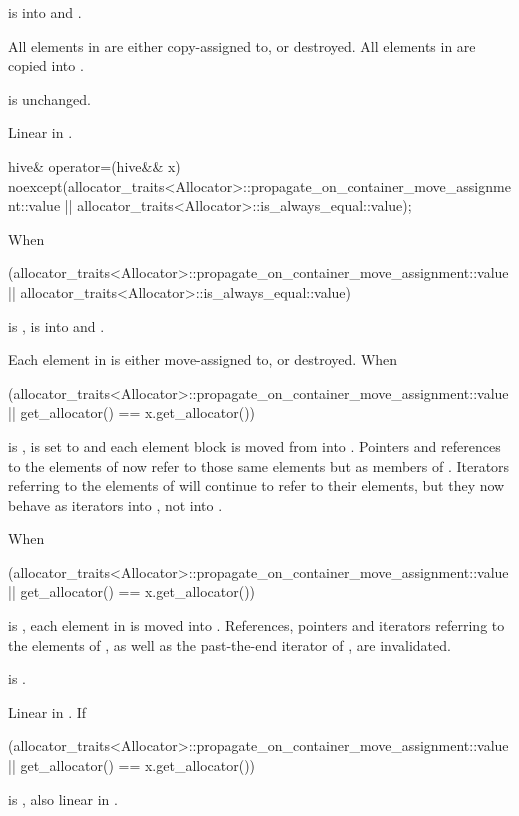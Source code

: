 \begin{itemdescr}
\pnum
\expects
{} is  into  and
.

\pnum
\effects
All elements in  are either copy-assigned to, or destroyed.
All elements in  are copied into .
\begin{note}
 is unchanged.
\end{note}

\pnum
\complexity
Linear in .
\end{itemdescr}

%
\begin{itemdecl}
hive& operator=(hive&& x)
  noexcept(allocator_traits<Allocator>::propagate_on_container_move_assignment::value ||
           allocator_traits<Allocator>::is_always_equal::value);
\end{itemdecl}

\begin{itemdescr}
\pnum
\expects
When
\begin{codeblock}
(allocator_traits<Allocator>::propagate_on_container_move_assignment::value ||
 allocator_traits<Allocator>::is_always_equal::value)
\end{codeblock}
is ,
 is  into  and
.

\pnum
\effects
Each element in  is either move-assigned to, or destroyed.
When
\begin{codeblock}
(allocator_traits<Allocator>::propagate_on_container_move_assignment::value ||
 get_allocator() == x.get_allocator())
\end{codeblock}
is ,
 is set to  and
each element block is moved from  into .
Pointers and references to the elements of 
now refer to those same elements but as members of .
Iterators referring to the elements of 
will continue to refer to their elements,
but they now behave as iterators into , not into .

When
\begin{codeblock}
(allocator_traits<Allocator>::propagate_on_container_move_assignment::value ||
 get_allocator() == x.get_allocator())
\end{codeblock}
is ,
each element in  is moved into .
References, pointers and iterators referring to the elements of ,
as well as the past-the-end iterator of , are invalidated.

\pnum
\ensures
{} is .

\pnum
\complexity
Linear in .
If
\begin{codeblock}
(allocator_traits<Allocator>::propagate_on_container_move_assignment::value ||
 get_allocator() == x.get_allocator())
\end{codeblock}
is , also linear in .
\end{itemdescr}

